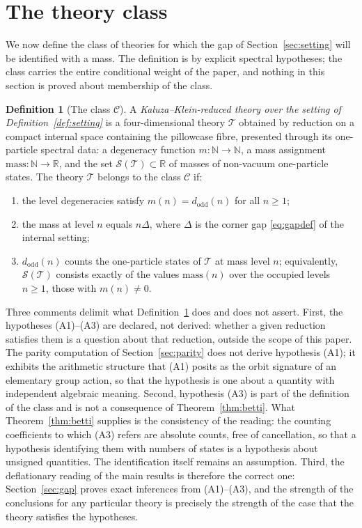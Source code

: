 \documentclass[11pt,a4paper]{article}
\newcommand{\R}{\mathbb{R}}
\newcommand{\N}{\mathbb{N}}
\newcommand{\dodd}{d_{\mathrm{odd}}}
\newcommand{\class}{\mathcal{C}}
\newcommand{\thy}{\mathcal{T}}
\theoremstyle{plain}
\theoremstyle{definition}
\newtheorem{definition}[theorem]{Definition}
\theoremstyle{remark}
\begin{document}
\section{The theory class}\label{sec:class}

We now define the class of theories for which the gap of Section~\ref{sec:setting} will be identified with a mass. The definition is by explicit spectral hypotheses; the class carries the entire conditional weight of the paper, and nothing in this section is proved about membership of the class.

\begin{definition}[The class $\class$]\label{def:class}
A \emph{Kaluza--Klein-reduced theory over the setting of Definition~\ref{def:setting}} is a four-dimensional theory $\thy$ obtained by reduction on a compact internal space containing the pillowcase fibre, presented through its one-particle spectral data: a degeneracy function $m \colon \N \to \N$, a mass assignment $\mathrm{mass} \colon \N \to \R$, and the set $\mathcal{S}(\thy) \subset \R$ of masses of non-vacuum one-particle states. The theory $\thy$ belongs to the class $\class$ if:
\begin{enumerate}[label=\textup{(A\arabic*)}]
\item the level degeneracies satisfy $m(n) = \dodd(n)$ for all
$n \ge 1$;
\item the mass at level $n$ equals $n\Delta$, where $\Delta$ is the
corner gap \eqref{eq:gapdef} of the internal setting;
\item $\dodd(n)$ counts the one-particle states of $\thy$ at mass
level $n$; equivalently, $\mathcal{S}(\thy)$ consists exactly of the values $\mathrm{mass}(n)$ over the occupied levels $n \ge 1$, those with $m(n) \ne 0$.
\end{enumerate}
\end{definition}

Three comments delimit what Definition~\ref{def:class} does and does not assert. First, the hypotheses (A1)--(A3) are declared, not derived: whether a given reduction satisfies them is a question about that reduction, outside the scope of this paper. The parity computation of Section~\ref{sec:parity} does not derive hypothesis (A1); it exhibits the arithmetic structure that (A1) posits as the orbit signature of an elementary group action, so that the hypothesis is one about a quantity with independent algebraic meaning. Second, hypothesis (A3) is part of the definition of the class and is not a consequence of Theorem~\ref{thm:betti}. What Theorem~\ref{thm:betti} supplies is the consistency of the reading: the counting coefficients to which (A3) refers are absolute counts, free of cancellation, so that a hypothesis identifying them with numbers of states is a hypothesis about unsigned quantities. The identification itself remains an assumption. Third, the deflationary reading of the main results is therefore the correct one: Section~\ref{sec:gap} proves exact inferences from (A1)--(A3), and the strength of the conclusions for any particular theory is precisely the strength of the case that the theory satisfies the hypotheses.
\end{document}
